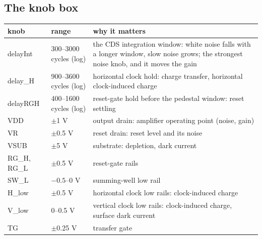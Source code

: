 \documentclass[11pt]{article}
\begin{document}
\subsection{The knob box}
\begin{center}\small
\begin{tabular}{llp{8.5cm}}\toprule
knob & range & why it matters\\\midrule
delayInt & 300--3000 cycles (log) & the CDS integration window: white noise falls with a longer window, slow noise grows; the strongest noise knob, and it moves the gain\\
delay\_H & 900--3600 cycles (log) & horizontal clock hold: charge transfer, horizontal clock-induced charge\\
delayRGH & 400--1600 cycles (log) & reset-gate hold before the pedestal window: reset settling\\
VDD & $\pm$1 V & output drain: amplifier operating point (noise, gain)\\
VR & $\pm$0.5 V & reset drain: reset level and its noise\\
VSUB & $\pm$5 V & substrate: depletion, dark current\\
RG\_H, RG\_L & $\pm$0.5 V & reset-gate rails\\
SW\_L & $-0.5$--0 V & summing-well low rail\\
H\_low & $\pm$0.5 V & horizontal clock low rails: clock-induced charge\\
V\_low & 0--0.5 V & vertical clock low rails: clock-induced charge, surface dark current\\
TG & $\pm$0.25 V & transfer gate\\\bottomrule
\end{tabular}
\end{center}
\end{document}
